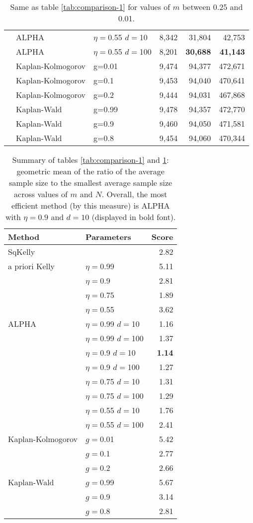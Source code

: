 \documentclass[aoas]{imsart}
\begin{document}
\begin{table}
\begin{tabular}{lll|rrr}
\cline{2-6}
& ALPHA & $\eta=$0.55 $d=$10 & 8,342  & 31,804  & 42,753  \\
& ALPHA & $\eta=$0.55 $d=$100 & 8,201  & \bf{30,688}  & \bf{41,143}  \\
\cline{2-6}
 & Kaplan-Kolmogorov & g=0.01 & 9,474  & 94,377  & 472,671  \\
 & Kaplan-Kolmogorov & g=0.1 & 9,453  & 94,040  & 470,641  \\
 & Kaplan-Kolmogorov & g=0.2 & 9,444  & 94,031  & 467,868  \\
\cline{2-6}
 & Kaplan-Wald & g=0.99 & 9,478  & 94,357  & 472,770  \\
 & Kaplan-Wald & g=0.9 & 9,460  & 94,050  & 471,581  \\
 & Kaplan-Wald & g=0.8 & 9,454  & 94,060  & 470,344  \\
 \end{tabular}
 \caption{\protect \label{tab:comparison-2} Same as table \ref{tab:comparison-1} for values of
$m$ between 0.25 and 0.01.}
\end{table}

\begin{table}
\centering
\tiny
\begin{tabular}{llr}\\ 
Method & Parameters & Score \\
\hline SqKelly & & 2.82 \\ 
 \hline a priori Kelly 
 & $\eta=$0.99 & 5.11 \\
 & $\eta=$0.9 & 2.81 \\
 & $\eta=$0.75 & 1.89 \\
 & $\eta=$0.55 & 3.62 \\
\hline ALPHA 
 & $\eta=$0.99 $d=$10 & 1.16 \\ 
 & $\eta=$0.99 $d=$100 & 1.37 \\ 
\cline{2-3}
 & $\eta=$0.9 $d=$10 & \bf{1.14} \\ 
 & $\eta=$0.9 $d=$100 & 1.27 \\ 
\cline{2-3}
 & $\eta=$0.75 $d=$10 & 1.31 \\ 
 & $\eta=$0.75 $d=$100 & 1.29 \\ 
\cline{2-3}
 & $\eta=$0.55 $d=$10 & 1.76 \\ 
 & $\eta=$0.55 $d=$100 & 2.41 \\ 
\cline{2-3}
\hline Kaplan-Kolmogorov
 & $g=$0.01 & 5.42\\ 
 & $g=$0.1 & 2.77\\ 
 & $g=$0.2 & 2.66\\ 
\hline Kaplan-Wald
 & $g=$0.99 & 5.67\\ 
 & $g=$0.9 & 3.14\\ 
 & $g=$0.8 & 2.81\\ 
\end{tabular}
\caption{\protect \label{tab:comparison-summary}
Summary of tables \ref{tab:comparison-1} and \ref{tab:comparison-2}: geometric mean of
the ratio of the average sample size to the smallest average sample size across values of $m$ and $N$.
Overall, the most efficient method (by this measure) is ALPHA with $\eta=0.9$ and $d=10$ (displayed in bold font).}
\end{table}
\end{document}
